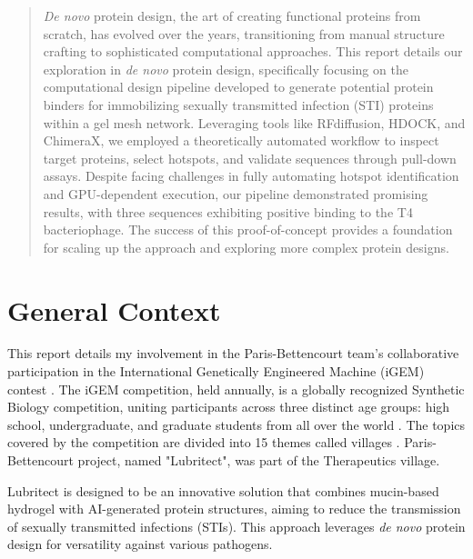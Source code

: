 \documentclass[11pt,a4paper]{article}
\begin{document}
\tableofcontents
\newpage

\begin{abstract}

    \emph{De novo} protein design, the art of creating functional proteins from scratch, has evolved over the years, transitioning from manual structure crafting to sophisticated computational approaches. This report details our exploration in \emph{de novo} protein design, specifically focusing on the computational design pipeline developed to generate potential protein binders for immobilizing sexually transmitted infection (STI) proteins within a gel mesh network. Leveraging tools like RFdiffusion, HDOCK, and ChimeraX, we employed a theoretically automated workflow to inspect target proteins, select hotspots, and validate sequences through pull-down assays. Despite facing challenges in fully automating hotspot identification and GPU-dependent execution, our pipeline demonstrated promising results, with three sequences exhibiting positive binding to the T4 bacteriophage. The success of this proof-of-concept provides a foundation for scaling up the approach and exploring more complex protein designs.
    
    \end{abstract}

\section{General Context}

This report details my involvement in the Paris-Bettencourt team's 
collaborative participation in the International Genetically Engineered 
Machine (iGEM) contest \cite{igem_main}. The iGEM competition, held annually, 
is a globally recognized Synthetic Biology competition, uniting 
participants across three distinct age groups: high school, 
undergraduate, and graduate students from all over the world
\cite{igem_description}.
The topics covered by the competition are divided into 15 themes called villages \cite{igem_villages}.
Paris-Bettencourt project, named "Lubritect", was part of the Therapeutics village.

Lubritect is designed to be an innovative solution that combines 
mucin-based hydrogel with AI-generated protein structures, aiming to 
reduce the transmission of sexually transmitted infections (STIs). This 
approach leverages \emph{de novo} protein design for versatility against 
various pathogens. 
\end{document}
